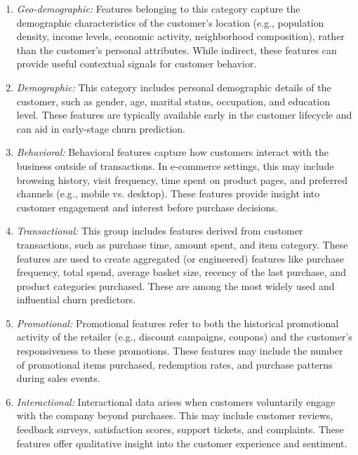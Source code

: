 \begin{enumerate} 
\item \textit{Geo-demographic:}
Features belonging to this category capture the demographic characteristics of the customer's location (e.g., population density, income levels, economic activity, neighborhood composition), rather than the customer's personal attributes. %
While indirect, these features can provide useful contextual signals for customer behavior.

\item \textit{Demographic:}
This category includes personal demographic details of the customer, such as gender, age, marital status, occupation, and education level. These features are typically available early in the customer lifecycle and can aid in early-stage churn prediction.

\item \textit{Behavioral:}
Behavioral features capture how customers interact with the business outside of transactions. In e-commerce settings, this may include browsing history, visit frequency, time spent on product pages, and preferred channels (e.g., mobile vs. desktop). These features provide insight into customer engagement and interest before purchase decisions.

\item \textit{Transactional:}
This group includes features derived from customer transactions, such as purchase time, amount spent, and item category. These features are used to create aggregated (or engineered) features like purchase frequency, total spend, average basket size, recency of the last purchase, and product categories purchased. These are among the most widely used and influential churn predictors.

\item \textit{Promotional:}
Promotional features refer to both the historical promotional activity of the retailer (e.g., discount campaigns, coupons) and the customer's responsiveness to these promotions. These features may include the number of promotional items purchased, redemption rates, and purchase patterns during sales events.

\item \textit{Interactional:}
Interactional data arises when customers voluntarily engage with the company beyond purchases. This may include customer reviews, feedback surveys, satisfaction scores, support tickets, and complaints. These features offer qualitative insight into the customer experience and sentiment. 
\end{enumerate}

